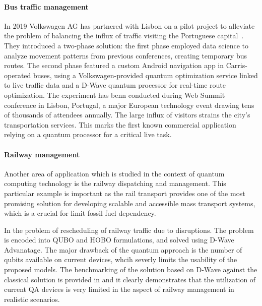 \documentclass[a4paper,11pt]{article}
\begin{document}
%

\paragraph{Bus traffic management}
In 2019 Volkswagen AG has partnered with Lisbon on a pilot project to alleviate the problem of balancing the influx of traffic visiting the Portuguese capital~\cite{yarkoni2020quantum}. They introduced a two-phase solution: the first phase employed data science to analyze movement patterns from previous conferences, creating temporary bus routes. The second phase featured a custom Android navigation app in Carris-operated buses, using a Volkswagen-provided quantum optimization service linked to live traffic data and a D-Wave quantum processor for real-time route optimization. The experiment has benn conducted during Web Summit conference in Lisbon, Portugal, a major European technology event drawing tens of thousands of attendees annually. The large influx of visitors strains the city's transportation services.  This marks the first known commercial application relying on a quantum processor for a critical live task.

 
\paragraph{Railway management}

Another area of application which is studied in the context of quantum computing technology is the railway dispatching and management. This particular example is important as the rail transport provides one of the most promising solution for developing scalable and accessible mass transport systems, which is a crucial for limit fossil fuel dependency.


In \cite{domino2022quadratic} the problem of rescheduling of railway traffic due to disruptions. The problem is encoded into QUBO and HOBO formulations, and solved using D-Wave Advanatage. The major drawback of the quantum approach is the number of qubits available on current devices, whcih severly limits the usability of the proposed models. The benchmarking of the solution based on D-Wave against the classical solution is provided in \cite{domino2023quantum} and it clearly demonstrates that the utilization of current QA devices is very limited in the aspect of railway management in realistic scenarios. 
\end{document}
